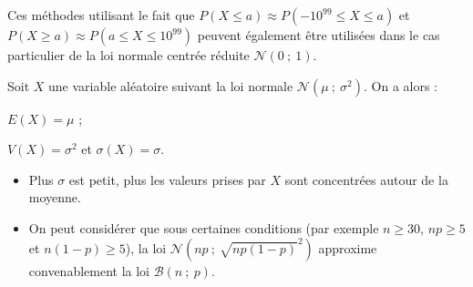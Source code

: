 \documentclass{cornouaille}
\begin{document}
\begin{remarque} Ces méthodes utilisant le fait que $P(X\leqslant a)\approx P(-10^{99}\leqslant X\leqslant a)$ et\linebreak $P(X\geqslant a)\approx P(a\leqslant X\leqslant 10^{99})$  peuvent également être utilisées dans le cas particulier de la loi normale centrée réduite $\mathcal{N}(0\ ;\ 1)$.
\end{remarque}





\begin{propriete}
Soit $X$ une variable aléatoire suivant la loi normale $\mathcal{N}(\mu\ ;\ \sigma^2)$. On a alors :
\begin{colitemize}{2}
	\item $E(X)=\mu$ ;
	\item $V(X)=\sigma^2$ et $\sigma(X)=\sigma$.
\end{colitemize}

\end{propriete}

\begin{remarques}
 \begin{itemize}
   \item Plus $\sigma$ est petit, plus les valeurs prises par $X$ sont concentrées autour de la moyenne.

\begin{center}
\end{center}
\item On peut considérer que sous certaines conditions (par exemple ${n\geqslant30}$, ${np\geqslant 5}$ et ${n(1-p)\geqslant5}$), la loi $\mathcal{N}(np\ ;\ \sqrt{np(1-p)}^2)$ approxime convenablement la loi $\mathcal{B}(n\ ;\ p)$.
 \end{itemize}

\end{remarques}
\end{document}
